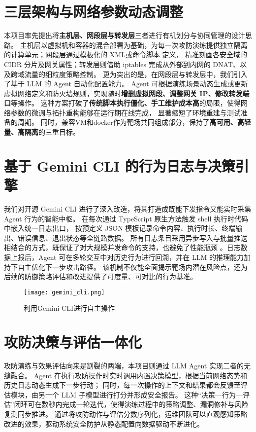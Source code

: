 \documentclass[lang=cn,10pt]{elegantbook}
\begin{document}
\section{三层架构与网络参数动态调整}  
本项目率先提出将\textbf{主机层、网段层与转发层}三者进行有机划分与协同管理的设计思路。
主机层以虚拟机和容器的混合部署为基础，为每一次攻防演练提供独立隔离的计算单元；网段层通过模板化的 XML或命令脚本 定义，
精准刻画各安全域的 CIDR 分片及网关属性；转发层则借助 iptables 完成从外部到内网的 DNAT、以及跨域流量的细粒度策略控制。
更为突出的是，在网段层与转发层中，我们引入了基于 LLM 的 Agent 自动化配置能力。
Agent 可根据演练场景动态生成或更新虚拟网络定义和防火墙规则，实现随时\textbf{增删虚拟网段、调整网关 IP、修改转发端口}等操作。
这种方案打破了\textbf{传统脚本执行僵化、手工维护成本高}的局限，使得网络参数的微调与拓扑重构能够在运行期在线完成，
显著缩短了环境重建与测试准备的周期。
同时，兼容VM和docker作为靶场共同组成部分，保持了\textbf{高可用、高轻量、高隔离}的三重目标。

\section{基于 Gemini CLI 的行为日志与决策引擎}  
我们对开源 Gemini CLI 进行了深入改造，将其打造成既能下发指令又能实时采集 Agent 行为的智能中枢。
在每次通过 TypeScript 原生方法触发 shell 执行时代码中嵌入统一日志出口，
按预定义 JSON 模板记录命令内容、执行时长、终端输出、错误信息、退出状态等全链路数据。
所有日志条目采用异步写入与批量推送相结合的方式，既保证了对大规模并发命令的支持，也避免了性能瓶颈
。日志数据上报后，Agent 可在多轮交互中对历史行为进行回溯，并在 LLM 的推理能力加持下自主优化下一步攻击路径。
该机制不仅能全面揭示靶场内潜在风险点，还为后续的防御策略评估和改进提供了可度量、可对比的行为基准。
\begin{figure}[!h]
\centering
\texttt{[image: gemini\_cli.png]}  %
\caption{利用Gemini CLI进行自主操作}  %
\label{fig:Gemini}  %
\end{figure}
\section{攻防决策与评估一体化}  
攻防演练与效果评估向来是割裂的两端，本项目则通过 LLM Agent 实现二者的无缝融合。
Agent 在执行攻防操作时实时调用内置决策模型，根据当前网络态势和历史日志动态生成下一步行动；
同时，每一次操作的上下文和结果都会反馈至评估模块，由另一个 LLM 子模型进行打分并形成安全报告。
这种“决策—行为—评估”闭环可在数秒内完成一轮迭代，使得演练过程中的策略调整、漏洞修补与风险复测同步推进。
通过将攻防动作与评估分数序列化，运维团队可以直观感知策略改进的效果，驱动系统安全防护从静态配置向数据驱动不断进化。
\end{document}
